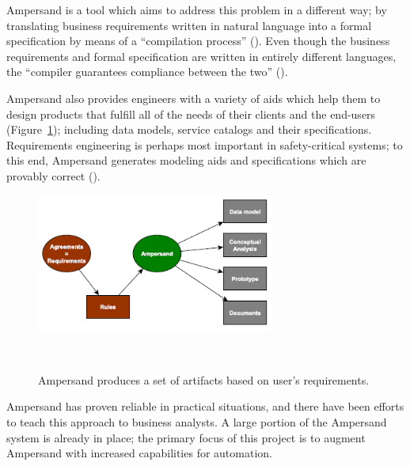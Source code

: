 \documentclass[12pt]{report}
\begin{document}
Ampersand is a tool which aims to address this problem in a different way; by
translating business requirements written in natural language into a formal
specification by means of a ``compilation process'' (\cite{derFun}). 
%
%
Even though the business requirements and formal specification are written in
entirely different languages, the ``compiler guarantees compliance between the
two'' (\cite[2]{derFun}). 

Ampersand also provides engineers with a variety of aids which
help them to design products that fulfill all of the needs of their clients and
the end-users (Figure~\ref{fig:figure1}); including data models, service 
catalogs and their
specifications. Requirements engineering is perhaps most important in
safety-critical systems; to this end, Ampersand generates modeling aids and
specifications which are provably correct (\cite{derFun}). 

\begin{figure}
    \centering
    \includegraphics[width=0.7\textwidth]{../figures/ampersand_artifacts}
    \caption{Ampersand produces a set of artifacts based on user's 
    requirements.}~\label{fig:figure1}
\end{figure}

Ampersand has proven reliable in practical situations, and there have been
efforts to teach this approach to business analysts. A large portion of the
Ampersand system is already in place; the primary focus of this project is to
augment Ampersand with increased capabilities for automation.
\end{document}
